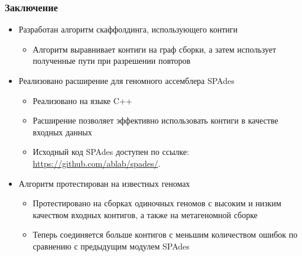 \documentclass{beamer}
\begin{document}

\begin{frame}\frametitle{Заключение}
\begin{itemize}
    \item Разработан алгоритм скаффолдинга, использующего
контиги
	\begin{itemize}
		\item Алгоритм выравнивает контиги на граф сборки, а затем использует полученные пути при разрешении повторов
	\end{itemize}
    \item Реализовано расширение для геномного ассемблера SPAdes
	\begin{itemize}
		\item Реализовано на языке C++
		\item Расширение позволяет эффективно использовать контиги в качестве входных данных
		\item \begin{sloppypar} Исходный код SPAdes доступен по ссылке: \mbox{\url{https://github.com/ablab/spades/}}.\end{sloppypar}
	\end{itemize}
    \item Алгоритм протестирован на известных геномах
	\begin{itemize}
		\item Протестировано на сборках одиночных геномов с высоким и низким качеством входных контигов, а также на метагеномной сборке
		\item Теперь соединяется больше контигов с меньшим количеством ошибок по сравнению с предыдущим модулем SPAdes
	\end{itemize}
\end{itemize}
\end{frame}

\end{document}
